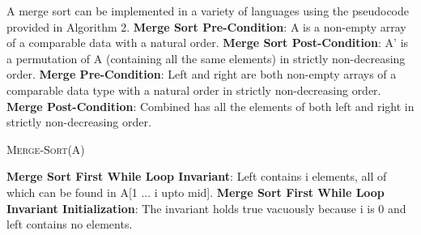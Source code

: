 \documentclass[onecolumn, 12pt, article]{IEEEtran}
\numberwithin{case}{problem}
\numberwithin{condition}{problem}
\numberwithin{condition}{subsection}
\numberwithin{definition}{section}
\theoremstyle{remark}
\numberwithin{question}{problem}
\theoremstyle{plain}
\numberwithin{answer}{problem}
\numberwithin{solution}{section}
\numberwithin{equation}{section}%
\begin{document}
A merge sort can be implemented in a variety of languages using the pseudocode provided in Algorithm 2.
\newline
\textbf{Merge Sort Pre-Condition}: A is a non-empty array of a comparable data with a natural order.
\newline
\textbf{Merge Sort Post-Condition}: A' is a permutation of A (containing all the same elements) in strictly non-decreasing order.
\newline
\textbf{Merge Pre-Condition}: Left and right are both non-empty arrays of a comparable data type with a natural order in strictly non-decreasing order.
\newline
\textbf{Merge Post-Condition}: Combined has all the elements of both left and right in strictly non-decreasing order.
\begin{algorithm}
\caption {\textsc{Merge-Sort}(A)}
\label{algo:mergesort}
\begin{algorithmic}[1]
\EndIf
{}
\EndFor
{}
\EndFor
{}
\EndProcedure
\newline
{}
	\EndIf
	\EndIf
\EndWhile
{}
\EndWhile
{}
\EndWhile
{}
\EndProcedure
\end{algorithmic}
\end{algorithm}
\newline
\textbf{Merge Sort First While Loop Invariant}: Left contains i elements, all of which can be found in A[1 ... i upto mid].
\newline
\textbf{Merge Sort First While Loop Invariant Initialization}: The invariant holds true vacuously because i is 0 and left contains no elements.
\newline
\end{document}
